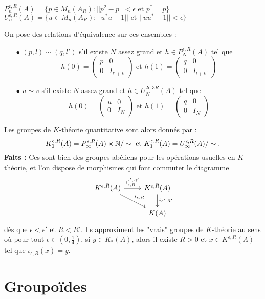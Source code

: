 \begin{definition}
$P_n^{\epsilon,R}(A)=\{p\in M_n(A_R) : ||p^2-p||<\epsilon \text{ et } p^*=p\}$
$U_n^{\epsilon,R}(A)=\{u\in M_n(A_R) : ||u^*u-1|| \text{ et } ||uu^*-1||<\epsilon \}$
\end{definition}

On pose des relations d'équivalence sur ces ensembles :
\begin{itemize}
\item[$\bullet$] $(p,l)\sim (q,l')$ s'il existe $N$ assez grand et $h\in P_N^{\epsilon,R}(A)$ tel que 
\[h(0) = \begin{pmatrix}p & 0 \\ 0 & I_{l'+k}\end{pmatrix}\text{ et } h(1)=\begin{pmatrix}q & 0 \\ 0 & I_{l+k'}\end{pmatrix}\]
\item[$\bullet$] $u\sim v $ s'il existe $N$ assez grand et $h\in U_N^{2\epsilon,3R}(A)$ tel que 
\[h(0) = \begin{pmatrix}u & 0 \\ 0 & I_{N}\end{pmatrix}\text{ et } h(1)=\begin{pmatrix}q & 0 \\ 0 & I_{N}\end{pmatrix}\]
\end{itemize} 

Les groupes de $K$-théorie quantitative sont alors donnés par :
\[K_0^{\epsilon,R}(A)= P_\infty^{\epsilon,R}(A)\times \mathbb N /\sim\text{ et } K_1^{\epsilon,R}(A)=U_\infty^{\epsilon,R}(A)/\sim.\]
\textbf{Faits :} Ces sont bien des groupes abéliens pour les opérations usuelles en $K$-théorie, et l'on dispose de morphismes qui font commuter le diagramme
\[\begin{tikzcd}
K^{\epsilon,R}(A)\arrow{r}{\iota_{\epsilon,R}^{\epsilon',R'}}\arrow{rd}{\iota_{\epsilon,R}} & K^{\epsilon,R}(A) \arrow{d}{\iota_{\epsilon',R'}}\\
\ & K(A)
\end{tikzcd}\]
dès que $\epsilon<\epsilon'$ et $R<R'$.
Ils approximent les "vrais" groupes de $K$-théorie au sens où pour tout $\epsilon\in (0,\frac{1}{4})$, si $y\in K_*(A)$, alors il existe $R>0$ et $x\in K^{\epsilon, R}(A)$ tel que $\iota_{\epsilon,R}(x)=y$.

  
\section{Groupoïdes}

